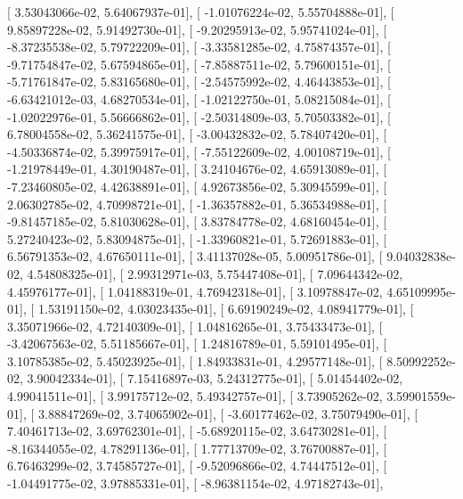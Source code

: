 \documentclass{article}
\begin{document}
       [  3.53043066e-02,   5.64067937e-01],
       [ -1.01076224e-02,   5.55704888e-01],
       [  9.85897228e-02,   5.91492730e-01],
       [ -9.20295913e-02,   5.95741024e-01],
       [ -8.37235538e-02,   5.79722209e-01],
       [ -3.33581285e-02,   4.75874357e-01],
       [ -9.71754847e-02,   5.67594865e-01],
       [ -7.85887511e-02,   5.79600151e-01],
       [ -5.71761847e-02,   5.83165680e-01],
       [ -2.54575992e-02,   4.46443853e-01],
       [ -6.63421012e-03,   4.68270534e-01],
       [ -1.02122750e-01,   5.08215084e-01],
       [ -1.02022976e-01,   5.56666862e-01],
       [ -2.50314809e-03,   5.70503382e-01],
       [  6.78004558e-02,   5.36241575e-01],
       [ -3.00432832e-02,   5.78407420e-01],
       [ -4.50336874e-02,   5.39975917e-01],
       [ -7.55122609e-02,   4.00108719e-01],
       [ -1.21978449e-01,   4.30190487e-01],
       [  3.24104676e-02,   4.65913089e-01],
       [ -7.23460805e-02,   4.42638891e-01],
       [  4.92673856e-02,   5.30945599e-01],
       [  2.06302785e-02,   4.70998721e-01],
       [ -1.36357882e-01,   5.36534988e-01],
       [ -9.81457185e-02,   5.81030628e-01],
       [  3.83784778e-02,   4.68160454e-01],
       [  5.27240423e-02,   5.83094875e-01],
       [ -1.33960821e-01,   5.72691883e-01],
       [  6.56791353e-02,   4.67650111e-01],
       [  3.41137028e-05,   5.00951786e-01],
       [  9.04032838e-02,   4.54808325e-01],
       [  2.99312971e-03,   5.75447408e-01],
       [  7.09644342e-02,   4.45976177e-01],
       [  1.04188319e-01,   4.76942318e-01],
       [  3.10978847e-02,   4.65109995e-01],
       [  1.53191150e-02,   4.03023435e-01],
       [  6.69190249e-02,   4.08941779e-01],
       [  3.35071966e-02,   4.72140309e-01],
       [  1.04816265e-01,   3.75433473e-01],
       [ -3.42067563e-02,   5.51185667e-01],
       [  1.24816789e-01,   5.59101495e-01],
       [  3.10785385e-02,   5.45023925e-01],
       [  1.84933831e-01,   4.29577148e-01],
       [  8.50992252e-02,   3.90042334e-01],
       [  7.15416897e-03,   5.24312775e-01],
       [  5.01454402e-02,   4.99041511e-01],
       [  3.99175712e-02,   5.49342757e-01],
       [  3.73905262e-02,   3.59901559e-01],
       [  3.88847269e-02,   3.74065902e-01],
       [ -3.60177462e-02,   3.75079490e-01],
       [  7.40461713e-02,   3.69762301e-01],
       [ -5.68920115e-02,   3.64730281e-01],
       [ -8.16344055e-02,   4.78291136e-01],
       [  1.77713709e-02,   3.76700887e-01],
       [  6.76463299e-02,   3.74585727e-01],
       [ -9.52096866e-02,   4.74447512e-01],
       [ -1.04491775e-02,   3.97885331e-01],
       [ -8.96381154e-02,   4.97182743e-01],
\end{document}
